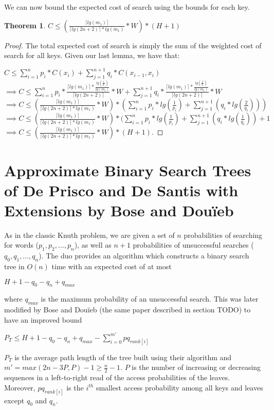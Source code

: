 \documentclass[letterpaper,12pt,titlepage,oneside,final]{book}
\theoremstyle{plain}
\newtheorem{thm}{Theorem}[section]
\begin{document}
We can now bound the expected cost of search using the bounds for each key.

\begin{thm}
$C \leq  (\frac{\lceil lg(m_1) \rceil}{\lceil lg(2n+2) \rceil*lg(m_1)} * W) * (H + 1)$
\end{thm}

\begin{proof}
The total expected cost of search is simply the sum of the weighted cost of search for all keys. Given our last lemma, we have that:

$C \leq \sum_{i=1}^{n} p_i*C(x_i) + \sum_{j=1}^{n+1} q_i*C(x_{i-1},x_i)$ \\

$\implies C \leq \sum_{i=1}^{n} p_i*\frac{\lceil lg(m_1) \rceil * \frac{lg(\frac{1}{p_i})}{lg(m_1)}}{\lceil lg(2n+2) \rceil} * W + \sum_{j=1}^{n+1} q_i*\frac{\lceil lg(m_1) \rceil * \frac{lg(\frac{2}{q_i})}{lg(m_1)}}{\lceil lg(2n+2) \rceil} * W$ \\

$\implies C \leq  (\frac{\lceil lg(m_1) \rceil}{\lceil lg(2n+2) \rceil*lg(m_1)} * W) * (\sum_{i=1}^{n} p_i*lg(\frac{1}{p_i}) + \sum_{j=1}^{n+1} (q_i*lg(\frac{2}{q_i})))$ \\

$\implies C \leq  (\frac{\lceil lg(m_1) \rceil}{\lceil lg(2n+2) \rceil*lg(m_1)} * W) * (\sum_{i=1}^{n} p_i*lg(\frac{1}{p_i}) + \sum_{j=1}^{n+1} (q_i*lg(\frac{1}{q_i}))+ 1$ \\

$\implies C \leq  (\frac{\lceil lg(m_1) \rceil}{\lceil lg(2n+2) \rceil*lg(m_1)} * W) * (H + 1)$.
\end{proof}


\section{Approximate Binary Search Trees of De Prisco and De Santis with Extensions by Bose and Dou\"{i}eb} \label{sec:deBST}

As in the classic Knuth problem, we are given a set of $n$ probabilities of searching for words ($p_1, p_2, ..., p_n$), as well as $n+1$ probabilities of unsuccessful searches ($q_0, q_1, ..., q_n$). The duo provides an algorithm which constructs a binary search tree in $O(n)$ time with an expected cost of at most \cite{de1993binary}
\begin{center}
$H+1-q_0-q_n+q_{max}$
\end{center}  where $q_{max}$ is the maximum probability of an unsuccessful search. This was later modified by Bose and Dou\"{i}eb (the same paper described in section TODO) to have an improved bound \cite{bose2009efficient}
\begin{center}
$P_T \leq H + 1 - q_0 - q_n + q_{max} - \sum_{i=0}^{m'} pq_{rank[i]}$
\end{center}
$P_T$ is the average path length of the tree built using their algorithm and $m'=max({2n-3P,P})-1 \geq \frac{n}{2} - 1$. $P$ is the number of increasing or decreasing sequences in a left-to-right read of the access probabilities of the leaves. Moreover, $pq_{rank[i]}$ is the $i^{th}$ smallest access probability among all keys and leaves except $q_0$ and $q_n$. \\
\end{document}
